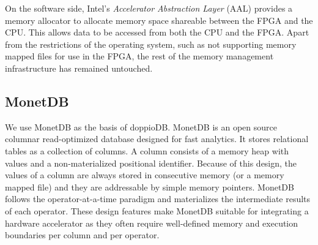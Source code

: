 \documentclass[11pt,dvipdfm]{article}
\begin{document}
On the software side, Intel's {\em Accelerator Abstraction Layer} (AAL) provides a memory allocator to allocate memory space shareable between the FPGA and the CPU. %
This allows data to be accessed from both the CPU and the FPGA. Apart from the restrictions of the operating system, such as not supporting memory mapped files for use in the FPGA, the rest of the memory management infrastructure has remained untouched.



\subsection{MonetDB}
We use MonetDB as the basis of doppioDB.
MonetDB is an open source columnar read-optimized database designed for fast analytics. It stores relational tables as a collection of columns. A column consists of a memory heap with values and a non-materialized positional identifier. Because of this design, the values of a column are always stored in consecutive memory (or a memory mapped file) and they are addressable by simple memory pointers. MonetDB follows the operator-at-a-time paradigm and materializes the intermediate results of each operator. These design features make MonetDB suitable for integrating a hardware accelerator as they often require well-defined memory and execution boundaries per column and per operator.
\end{document}

